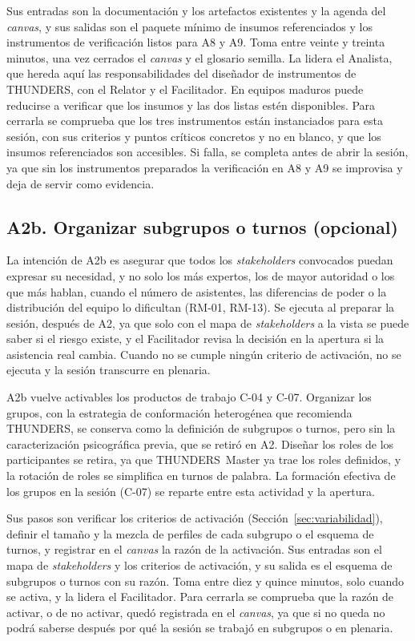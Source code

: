 \documentclass[12pt,letterpaper,oneside]{report}
\begin{document}
Sus entradas son la documentación y los artefactos existentes y la agenda del
\textit{canvas}, y sus salidas son el paquete mínimo de insumos referenciados y
los instrumentos de verificación listos para A8 y A9. Toma entre veinte y
treinta minutos, una vez cerrados el \textit{canvas} y el glosario semilla. La
lidera el Analista, que hereda aquí las responsabilidades del diseñador de
instrumentos de THUNDERS, con el Relator y el Facilitador. En equipos maduros
puede reducirse a verificar que los insumos y las dos listas estén disponibles.
Para cerrarla se comprueba que los tres instrumentos están instanciados para
esta sesión, con sus criterios y puntos críticos concretos y no en blanco, y que
los insumos referenciados son accesibles. Si falla, se completa antes de abrir
la sesión, ya que sin los instrumentos preparados la verificación en A8 y A9 se
improvisa y deja de servir como evidencia.

\subsection{A2b. Organizar subgrupos o turnos (opcional)}
La intención de A2b es asegurar que todos los \textit{stakeholders} convocados
puedan expresar su necesidad, y no solo los más expertos, los de mayor autoridad
o los que más hablan, cuando el número de asistentes, las diferencias de poder o
la distribución del equipo lo dificultan (RM-01, RM-13). Se ejecuta al preparar
la sesión, después de A2, ya que solo con el mapa de \textit{stakeholders} a la
vista se puede saber si el riesgo existe, y el Facilitador revisa la decisión en
la apertura si la asistencia real cambia. Cuando no se cumple ningún criterio de
activación, no se ejecuta y la sesión transcurre en plenaria.

A2b vuelve activables los productos de trabajo C-04 y C-07. Organizar los grupos, con la
estrategia de conformación heterogénea que recomienda THUNDERS, se conserva como
la definición de subgrupos o turnos, pero sin la caracterización psicográfica
previa, que se retiró en A2. Diseñar los roles de los participantes se retira,
ya que THUNDERS~Master ya trae los roles definidos, y la rotación de roles se
simplifica en turnos de palabra. La formación efectiva de los grupos en la
sesión (C-07) se reparte entre esta actividad y la apertura.

Sus pasos son verificar los criterios de activación
(Sección~\ref{sec:variabilidad}), definir el tamaño y la mezcla de perfiles de
cada subgrupo o el esquema de turnos, y registrar en el \textit{canvas} la razón
de la activación. Sus entradas son el mapa de \textit{stakeholders} y los
criterios de activación, y su salida es el esquema de subgrupos o turnos con su
razón. Toma entre diez y quince minutos, solo cuando se activa, y la lidera el
Facilitador. Para cerrarla se comprueba que la razón de activar, o de no
activar, quedó registrada en el \textit{canvas}, ya que si no queda no podrá
saberse después por qué la sesión se trabajó en subgrupos o en plenaria.
\end{document}
